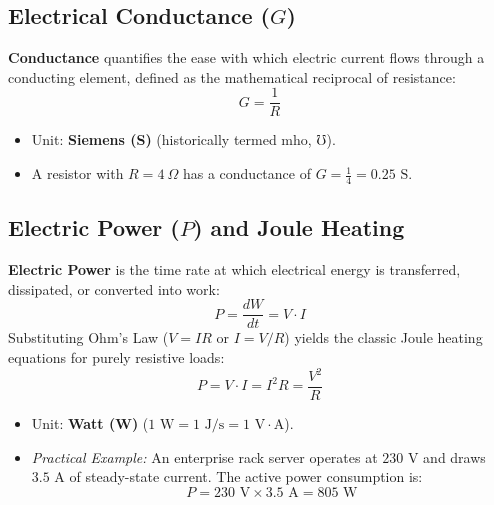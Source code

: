 \subsection{Electrical Conductance ($G$)}
\textbf{Conductance} quantifies the ease with which electric current flows through a conducting element, defined as the mathematical reciprocal of resistance:
\begin{equation}
\label{eq:conductance_def}
\boxed{G = \frac{1}{R}}
\end{equation}
\begin{itemize}
    \item Unit: \textbf{Siemens (S)} (historically termed mho, $\mho$).
    \item A resistor with $R = 4\ \Omega$ has a conductance of $G = \frac{1}{4} = 0.25\text{ S}$.
\end{itemize}

\subsection{Electric Power ($P$) and Joule Heating}
\textbf{Electric Power} is the time rate at which electrical energy is transferred, dissipated, or converted into work:
\begin{equation}
\label{eq:power_def}
\boxed{P = \frac{dW}{dt} = V \cdot I}
\end{equation}
Substituting Ohm's Law ($V = IR$ or $I = V/R$) yields the classic Joule heating equations for purely resistive loads:
\begin{equation}
\label{eq:power_joule}
\boxed{P = V \cdot I = I^2 R = \frac{V^2}{R}}
\end{equation}
\begin{itemize}
    \item Unit: \textbf{Watt (W)} ($1\text{ W} = 1\text{ J/s} = 1\text{ V}\cdot\text{A}$).
    \item \textit{Practical Example:} An enterprise rack server operates at $230\text{ V}$ and draws $3.5\text{ A}$ of steady-state current. The active power consumption is:
    \[ P = 230\text{ V} \times 3.5\text{ A} = 805\text{ W} \]
\end{itemize}

